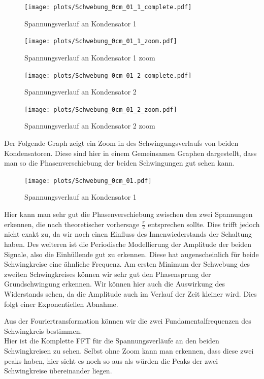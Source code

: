 \documentclass[twoside]{protokoll}
\begin{document}
\begin{figure}[H]
    \centering
    \texttt{[image: plots/Schwebung\_0cm\_01\_1\_complete.pdf]}
    \caption{Spannungsverlauf an Kondensator 1}
\end{figure}
\begin{figure}[H]
    \centering
    \texttt{[image: plots/Schwebung\_0cm\_01\_1\_zoom.pdf]}
    \caption{Spannungsverlauf an Kondensator 1 zoom}
\end{figure}


\begin{figure}[H]
    \centering
    \texttt{[image: plots/Schwebung\_0cm\_01\_2\_complete.pdf]}
    \caption{Spannungsverlauf an Kondensator 2}
\end{figure}
\begin{figure}[H]
    \centering
    \texttt{[image: plots/Schwebung\_0cm\_01\_2\_zoom.pdf]}
    \caption{Spannungsverlauf an Kondensator 2 zoom}
\end{figure}


Der Folgende Graph zeigt ein Zoom in des Schwingungsverlaufs von beiden Kondensatoren. Diese sind hier in einem Gemeinsamen Graphen dargestellt, dass man so die Phasenverschiebung der beiden Schwingungen gut sehen kann. 

\begin{figure}[H]
    \centering
    \texttt{[image: plots/Schwebung\_0cm\_01.pdf]}
    \caption{Spannungsverlauf an Kondensator 1}
    \label{Schwebung}
\end{figure}

Hier kann man sehr gut die Phasenverschiebung zwischen den zwei Spannungen erkennen, die nach theoretischer vorhersage $\frac{\pi}{2}$ entsprechen sollte. 
Dies trifft jedoch nicht exakt zu, da wir noch einen Einfluss des Innenwiederstands der Schaltung haben.
Des weiteren ist die Periodische Modellierung der Amplitude der beiden Signale, also die Einhüllende gut zu erkennen. 
Diese hat augenscheinlich für beide Schwingkreise eine ähnliche Frequenz.
Am ersten Minimum der Schwebung des zweiten Schwingkreises können wir sehr gut den Phasensprung der Grundschwingung erkennen.
Wir können hier auch die Auswirkung des Widerstands sehen, da die Amplitude auch im Verlauf der Zeit kleiner wird. 
Dies folgt einer Exponentiellen Abnahme.

Aus der Fouriertransformation können wir die zwei Fundamentalfrequenzen des Schwingkreis bestimmen. \\

Hier ist die Komplette FFT für die Spannungsverläufe an den beiden Schwingkreisen zu sehen. Selbst ohne Zoom kann man erkennen, dass diese zwei peaks haben, hier sieht es noch so aus als würden die Peaks der zwei Schwingkreise übereinander liegen.
\end{document}
